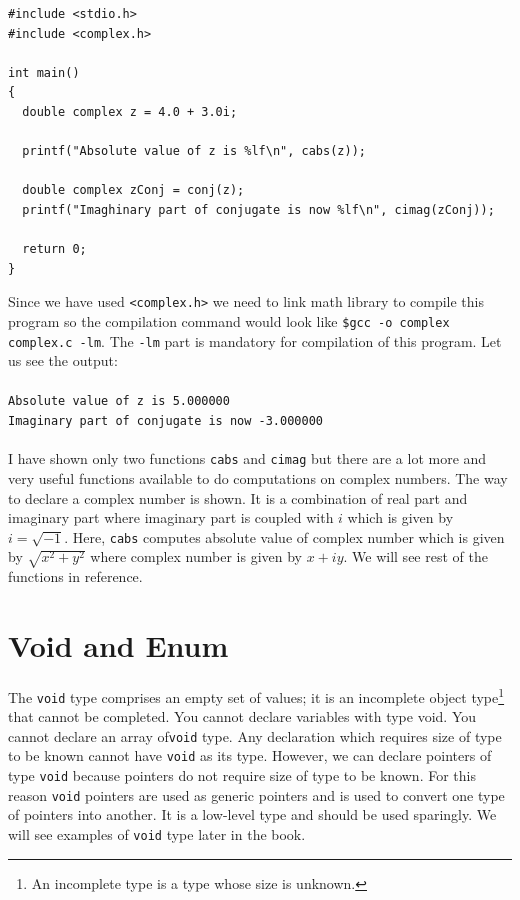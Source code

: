\begin{Verbatim}[frame=single]
#include <stdio.h>
#include <complex.h>

int main()
{
  double complex z = 4.0 + 3.0i;

  printf("Absolute value of z is %lf\n", cabs(z));

  double complex zConj = conj(z);
  printf("Imaghinary part of conjugate is now %lf\n", cimag(zConj));

  return 0;
}
\end{Verbatim}

Since we have used \texttt{<complex.h>} we need to link math library to compile
this program so the compilation command would look like \texttt{\$gcc -o complex
complex.c -lm}. The \texttt{-lm} part is mandatory for compilation of this
program. Let us see the output:
\\\\\texttt{Absolute value of z is 5.000000\\
Imaginary part of conjugate is now -3.000000\\\\}
I have shown only two functions \texttt{cabs} and \texttt{cimag} but there are
a lot more and very useful functions available to do computations on complex
numbers. The way to declare a complex number is shown. It is a combination of
real part and imaginary part where imaginary part is coupled with $i$ which is
given by $i = \sqrt{-1}$. Here, \texttt{cabs} computes absolute value of
complex number which is given by $\sqrt{x^2 + y^2}$ where complex number is
given by $x + iy$. We will see rest of the functions in reference.

\section{Void and Enum}
The \texttt{void} type comprises an empty set of values; it is an incomplete
object type\footnote{An incomplete type is a type whose size is unknown.} that
cannot be completed. You cannot declare variables with type void. You cannot
declare an array of\texttt{void} type. Any declaration which requires size of
type to be known cannot have \texttt{void} as its type. However, we can declare
pointers of type \texttt{void} because pointers do not require size of type to
be known. For this reason \texttt{void} pointers are used as generic pointers
and is used to convert one type of pointers into another. It is a low-level
type and should be used sparingly. We will see examples of \texttt{void} type
later in the book.

